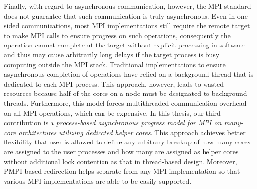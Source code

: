 Finally, with regard to asynchronous communication, however, the MPI standard does 
not guarantee that such communication is truly asynchronous. Even in one-sided 
communications, most MPI implementations still require the remote target to make 
MPI calls to ensure progress on such operations, consequently the operation 
cannot complete at the target without explicit processing in software and 
thus may cause arbitrarily long delays if the target process is busy computing 
outside the MPI stack. Traditional implementations to ensure asynchronous 
completion of operations have relied on a background thread that is 
dedicated to each MPI process. This approach, however, leads to wasted resources
because half of the cores on a node must be designated to background threads. 
Furthermore, this model forces multithreaded communication overhead on all MPI 
operations, which can be expensive. In this thesis, our third contribution is 
a \textit{process-based asynchronous progress model for MPI on many-core 
architectures utilizing dedicated helper cores}. This approach achieves better 
flexibility that user is allowed to define any arbitrary breakup of how many 
cores are assigned to the user processes and how many are assigned as helper 
cores without additional lock contention as that in thread-based design. Moreover, 
PMPI-based redirection helps separate from any MPI implementation so that various 
MPI implementations are able to be easily supported. 

\clearpage

